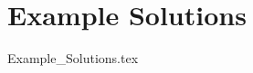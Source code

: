 \documentclass[11pt,a4paper,oneside]{book}
\theoremstyle{definition}%
\begin{document}




\part{Example Solutions}
{Example_Solutions.tex}



\printbibliography
\end{document}
